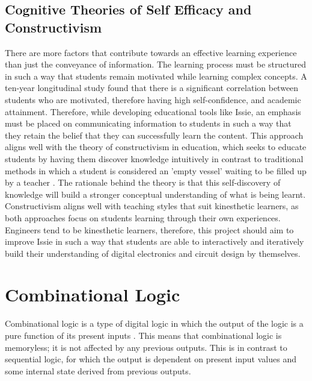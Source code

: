 \subsection{Cognitive Theories of Self Efficacy and Constructivism} \label{subsec:self_efficacy}
There are more factors that contribute towards an effective learning experience than just the conveyance of information. The learning process must be structured in such a way that students remain motivated while learning complex concepts. A ten-year longitudinal study \cite{motivation} found that there is a significant correlation between students who are motivated, therefore having high self-confidence, and academic attainment. Therefore, while developing educational tools like Issie, an emphasis must be placed on communicating information to students in such a way that they retain the belief that they can successfully learn the content. This approach aligns well with the theory of constructivism in education, which seeks to educate students by having them discover knowledge intuitively in contrast to traditional methods in which a student is considered an 'empty vessel' waiting to be filled up by a teacher \cite{construct}. The rationale behind the theory is that this self-discovery of knowledge will build a stronger conceptual understanding of what is being learnt. Constructivism aligns well with teaching styles that suit kinesthetic learners, as both approaches focus on students learning through their own experiences. Engineers tend to be kinesthetic learners, therefore, this project should aim to improve Issie in such a way that students are able to interactively and iteratively build their understanding of digital electronics and circuit design by themselves.

\section{Combinational Logic}
Combinational logic is a type of digital logic in which the output of the logic is a pure function of its present inputs \cite{comblog_wiki}. This means that combinational logic is memoryless; it is not affected by any previous outputs. This is in contrast to sequential logic, for which the output is dependent on present input values and some internal state derived from previous outputs.

